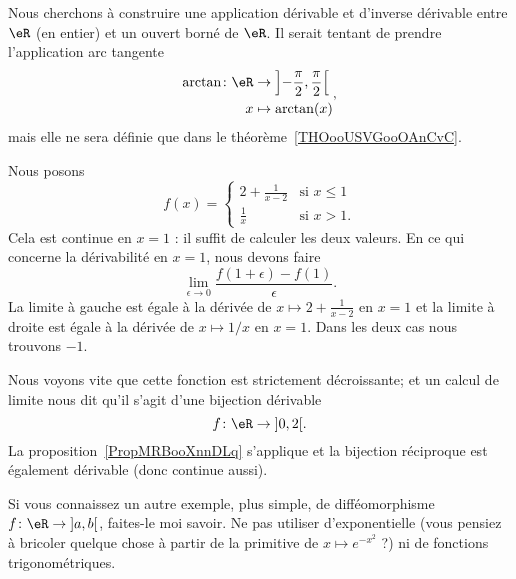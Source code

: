 \begin{example}      \label{EXooGKPNooZtmJen}
	Nous cherchons à construire une application dérivable et d'inverse dérivable entre \( \eR\) (en entier) et un ouvert borné de \( \eR\). Il serait tentant de prendre l'application arc tangente
	\begin{equation}
		\begin{aligned}
			\arctan\colon \eR & \to \left] -\frac{ \pi }{2} , \frac{ \pi }{2} \right[ \\
			x                 & \mapsto \arctan(x)
		\end{aligned},
	\end{equation}
	mais elle ne sera définie que dans le théorème~\ref{THOooUSVGooOAnCvC}.

	Nous posons
	\begin{equation}
		f(x)=\begin{cases}
			2+\frac{1}{ x-2 } & \text{si } x\leq 1 \\
			\frac{1}{ x }     & \text{si } x>1.
		\end{cases}
	\end{equation}
	Cela est continue en \( x=1\) : il suffit de calculer les deux valeurs. En ce qui concerne la dérivabilité en \( x=1\), nous devons faire
	\begin{equation}
		\lim_{\epsilon\to 0}\frac{ f(1+\epsilon)-f(1) }{ \epsilon }.
	\end{equation}
	La limite à gauche est égale à la dérivée de \( x\mapsto 2+\frac{ 1 }{ x-2 }\) en \( x=1\) et la limite à droite est égale à la dérivée de \( x\mapsto 1/x\) en \( x=1\). Dans les deux cas nous trouvons \( -1\).

	\begin{center}
		
	\end{center}

	Nous voyons vite que cette fonction est strictement décroissante; et un calcul de limite nous dit qu'il s'agit d'une bijection dérivable
	\begin{equation}
		f\colon \eR\to \mathopen] 0 , 2 \mathclose[.
	\end{equation}
	La proposition~\ref{PropMRBooXnnDLq} s'applique et la bijection réciproque est également dérivable (donc continue aussi).
\end{example}

\begin{probleme}
	Si vous connaissez un autre exemple, plus simple, de difféomorphisme \( f\colon \eR\to \mathopen] a , b \mathclose[\), faites-le moi savoir. Ne pas utiliser d'exponentielle (vous pensiez à bricoler quelque chose à partir de la primitive de \( x\mapsto  e^{-x^2}\) ?) ni de fonctions trigonométriques.
\end{probleme}

